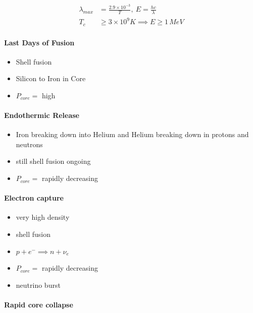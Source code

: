 \documentclass[a4paper,11pt,normalem]{article}
\begin{document}
\[
    \begin{aligned}
    \lambda_{max} &= \frac{2.9\times10^{-3}}{T}, ~ E = \frac{hc}{\lambda} \\
    T_c &\geq 3\times10^9 K \implies E \geq 1\,MeV
    \end{aligned}
\]

\paragraph{Last Days of Fusion}\label{last-days-of-fusion}

\begin{itemize}
\item
  Shell fusion
\item
  Silicon to Iron in Core
\item
  \(P_{core} =\) high
\end{itemize}

\paragraph{Endothermic Release}\label{endothermic-release}

\begin{itemize}
\item
  Iron breaking down into Helium and Helium breaking down in protons and
  neutrons
\item
  still shell fusion ongoing
\item
  \(P_{core} =\) rapidly decreasing
\end{itemize}

\paragraph{Electron capture}\label{electron-capture}

\begin{itemize}
\item
  very high density
\item
  shell fusion
\item
  \(p + e^- \implies n + \nu_e\)
\item
  \(P_{core} =\) rapidly decreasing
\item
  neutrino burst
\end{itemize}

\paragraph{Rapid core collapse}\label{rapid-core-collapse}
\end{document}
